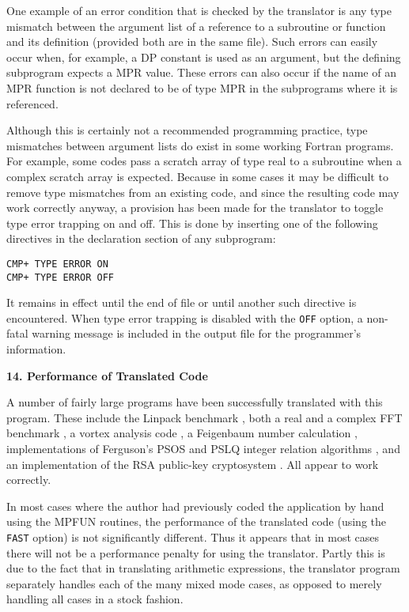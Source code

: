 One example of an error condition that is checked by the translator is
any type mismatch between the argument list of a reference to a
subroutine or function and its definition (provided both are in the
same file).  Such errors can easily occur when, for example, a DP
constant is used as an argument, but the defining subprogram expects a
MPR value.  These errors can also occur if the name of an MPR function
is not declared to be of type MPR in the subprograms where it is
referenced.

Although this is certainly not a recommended programming practice,
type mismatches between argument lists do exist in some working
Fortran programs.  For example, some codes pass a scratch array of
type real to a subroutine when a complex scratch array is expected.
Because in some cases it may be difficult to remove type mismatches
from an existing code, and since the resulting code may work correctly
anyway, a provision has been made for the translator to toggle type
error trapping on and off.  This is done by inserting one of the
following directives in the declaration section of any subprogram:

\begin{tt} \begin{small} \begin{verbatim}
CMP+ TYPE ERROR ON
CMP+ TYPE ERROR OFF
\end{verbatim} \end{small} \end{tt}

It remains in effect until the end of file or until another such
directive is encountered.  When type error trapping is disabled with
the {\tt OFF} option, a non-fatal warning message is included in the
output file for the programmer's information.

\vspace{2ex} \noindent
{\bf 14. Performance of Translated Code}

A number of fairly large programs have been successfully translated
with this program.  These include the Linpack benchmark \cite{dong},
both a real and a complex FFT benchmark \cite{dhb2}, a vortex analysis
code \cite{krasny}, a Feigenbaum number calculation \cite{briggs},
implementations of Ferguson's PSOS and PSLQ integer relation
algorithms \cite{dhb3,dhb4}, and an implementation of the RSA
public-key cryptosystem \cite{rsa}.  All appear to work correctly.

In most cases where the author had previously coded the application by
hand using the MPFUN routines, the performance of the translated code
(using the {\tt FAST} option) is not significantly different.  Thus it
appears that in most cases there will not be a performance penalty for
using the translator.  Partly this is due to the fact that in
translating arithmetic expressions, the translator program separately
handles each of the many mixed mode cases, as opposed to merely
handling all cases in a stock fashion.

